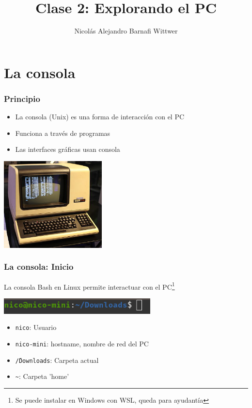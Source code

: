 \documentclass[14pt,aspectratio=169,xcolor=dvipsnames]{beamer}
\title[short title]{Clase 2: Explorando el PC}
\subtitle{}
\author[NA Barnafi] {Nicolás Alejandro Barnafi Wittwer}
\institute[UC|CMM] 
{
    Pontificia Universidad Católica de Chile \\
    Centro de Modelamiento Matemático
}
\begin{document}
\begin{frame}
    \maketitle
\end{frame}
\section{La consola}
\begin{frame}\frametitle{Principio}
    \begin{itemize}
        \item La consola (Unix) es una forma de interacción con el PC
        \item Funciona a través de programas
        \item Las interfaces gráficas usan consola
    \end{itemize}
    \begin{flushright}
        \includegraphics[width=0.4\textwidth]{../images/os-unix.png}
    \end{flushright}
\end{frame}
\begin{frame}\frametitle{La consola: Inicio}
La consola Bash en Linux permite interactuar con el PC\footnote{Se puede instalar en Windows con WSL, queda para ayudantía}

    \begin{center}
        \includegraphics[width=0.6\textwidth]{../images/consola.png}
    \end{center}
\begin{itemize}
    \item \texttt{nico}: Usuario
    \item \texttt{nico-mini}: hostname, nombre de red del PC
    \item \texttt{\~/Downloads}: Carpeta actual
    \item \texttt{\~}: Carpeta 'home'
\end{itemize}
\end{frame}
\end{document}
